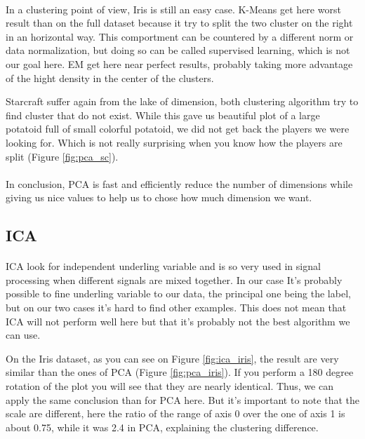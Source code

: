 \documentclass[twocolumn,a4paper,10pt]{article}
\begin{document}
\paragraph{}
In a clustering point of view, Iris is still an easy case. K-Means get here worst result than on the full dataset because it try to split the two cluster on the right in an horizontal way. This comportment can be countered by a different norm or data normalization, but doing so can be called supervised learning, which is not our goal here. EM get here near perfect results, probably taking more advantage of the hight density in the center of the clusters.

Starcraft suffer again from the lake of dimension, both clustering algorithm try to find cluster that do not exist. While this gave us beautiful plot of a large potatoid full of small colorful potatoid, we did not get back the players we were looking for. Which is not really surprising when you know how the players are split (Figure \ref{fig:pca_sc}).

\paragraph{}
In conclusion, PCA is fast and efficiently reduce the number of dimensions while giving us nice values to help us to chose how much dimension we want.

\subsection{ICA}
\paragraph{}
ICA look for independent underling variable and is so very used in signal processing when different signals are mixed together. In our case It's probably possible to fine underling variable to our data, the principal one being the label, but on our two cases it's hard to find other examples. This does not mean that ICA will not perform well here but that it's probably not the best algorithm we can use.

On the Iris dataset, as you can see on Figure \ref{fig:ica_iris}, the result are very similar than the ones of PCA (Figure \ref{fig:pca_iris}). If you perform a 180 degree rotation of the plot you will see that they are nearly identical. Thus, we can apply the same conclusion than for PCA here. But it's important to note that the scale are different, here the ratio of the range of axis 0 over the one of axis 1 is about 0.75, while it was 2.4 in PCA, explaining the clustering difference.
\end{document}
